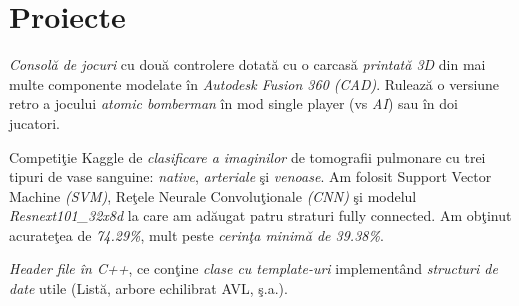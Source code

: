 %


\section{Proiecte}

{
\emph{Consol\u{a} de jocuri} cu dou\u{a} controlere dotat\u{a} cu o carcas\u{a} \emph{printat\u{a} 3D} din mai multe componente modelate \^{i}n \emph{Autodesk Fusion 360 (CAD)}. Ruleaz\u{a} o versiune retro a jocului \emph{atomic bomberman} \^{i}n mod single player (vs \emph{AI}) sau \^{i}n doi jucatori.
}

{
Competi\c{t}ie Kaggle de \emph{clasificare a imaginilor} de tomografii pulmonare cu trei tipuri de vase sanguine: \emph{native}, \emph{arteriale} \c{s}i \emph{venoase}. Am folosit Support Vector Machine \emph{(SVM)}, Re\c{t}ele Neurale Convolu\c{t}ionale \emph{(CNN)} \c{s}i modelul \emph{Resnext101\_32x8d} la care am ad\u{a}ugat patru straturi fully connected. Am ob\c{t}inut acurate\c{t}ea de \emph{74.29\%}, mult peste \emph{cerin\c{t}a minim\u{a} de 39.38\%}.
}

{
\emph{Header file \^{i}n C++}, ce con\c{t}ine \emph{clase cu template-uri} implement\^{a}nd \emph{structuri de date} utile (List\u{a}, arbore echilibrat AVL, \c{s}.a.).
}

